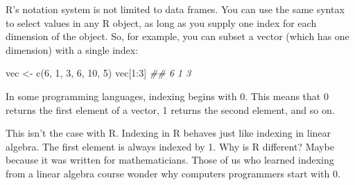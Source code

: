 \documentclass[
  letterpaper,
  DIV=11,
  numbers=noendperiod]{scrbook}
\newenvironment{Shaded}{\begin{snugshade}}{\end{snugshade}}
\newcommand{\DecValTok}[1]{\textcolor[rgb]{0.68,0.00,0.00}{#1}}
\newcommand{\DocumentationTok}[1]{\textcolor[rgb]{0.37,0.37,0.37}{\textit{#1}}}
\newcommand{\FunctionTok}[1]{\textcolor[rgb]{0.28,0.35,0.67}{#1}}
\newcommand{\NormalTok}[1]{\textcolor[rgb]{0.00,0.23,0.31}{#1}}
\newcommand{\OtherTok}[1]{\textcolor[rgb]{0.00,0.23,0.31}{#1}}
\newcommand{\SpecialCharTok}[1]{\textcolor[rgb]{0.37,0.37,0.37}{#1}}
\begin{document}
R's notation system is not limited to data frames. You can use the same
syntax to select values in any R object, as long as you supply one index
for each dimension of the object. So, for example, you can subset a
vector (which has one dimension) with a single index:

\begin{Shaded}
\begin{Highlighting}[]
\NormalTok{vec }\OtherTok{\textless{}{-}} \FunctionTok{c}\NormalTok{(}\DecValTok{6}\NormalTok{, }\DecValTok{1}\NormalTok{, }\DecValTok{3}\NormalTok{, }\DecValTok{6}\NormalTok{, }\DecValTok{10}\NormalTok{, }\DecValTok{5}\NormalTok{)}
\NormalTok{vec[}\DecValTok{1}\SpecialCharTok{:}\DecValTok{3}\NormalTok{]}
\DocumentationTok{\#\# 6 1 3}
\end{Highlighting}
\end{Shaded}

\begin{tcolorbox}[enhanced jigsaw, breakable, colback=white, colbacktitle=quarto-callout-tip-color!10!white, arc=.35mm, bottomrule=.15mm, coltitle=black, left=2mm, rightrule=.15mm, colframe=quarto-callout-tip-color-frame, leftrule=.75mm, opacitybacktitle=0.6, bottomtitle=1mm, toptitle=1mm, titlerule=0mm, opacityback=0, title=\textcolor{quarto-callout-tip-color}{\faLightbulb}\hspace{0.5em}{Indexing begins at 1}, toprule=.15mm]

In some programming languages, indexing begins with 0. This means that 0
returns the first element of a vector, 1 returns the second element, and
so on.

This isn't the case with R. Indexing in R behaves just like indexing in
linear algebra. The first element is always indexed by 1. Why is R
different? Maybe because it was written for mathematicians. Those of us
who learned indexing from a linear algebra course wonder why computers
programmers start with 0.

\end{tcolorbox}
\end{document}
